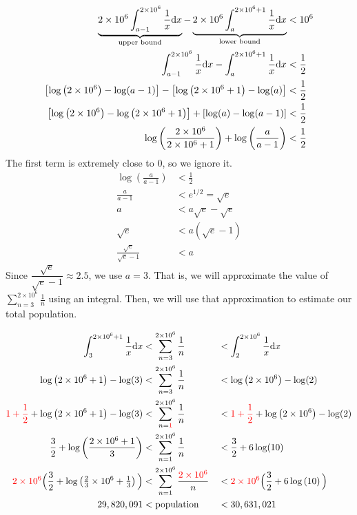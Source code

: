 \begin{solution}
	\begin{align*}
	\underbrace{2\times 10^6\int_{a-1}^{2\times 10^6} \frac{1}{x}\mathrm{d}x}_{\text{upper bound}} -
	\underbrace{2\times 10^6\int_{a}^{2\times 10^6+1} \frac{1}{x}\mathrm{d}x}_{\text{lower bound}} &<10^6\\
\int_{a-1}^{2\times 10^6} \frac{1}{x}\mathrm{d}x -
	\int_{a}^{2\times 10^6+1} \frac{1}{x}\mathrm{d}x &<\frac{1}{2}\\
	\left[\log\left(2\times 10^6 \right)-\log(a-1)\right]-\left[\log\left(2\times 10^6+1 \right)-\log(a)\right]&<\frac12\\
	\left[\log\left(2\times 10^6 \right)-\log\left(2\times 10^6+1 \right)\right]+\left[ \log(a)-\log(a-1)\right]&<\frac12\\
	\log\left(\frac{2\times 10^6}{2\times 10^6+1} \right)+
	\log\left(\frac{a}{a-1} \right)&<\frac{1}{2}
	\end{align*}
	The first term is extremely close to 0, so we ignore it.
	\begin{align*}
	\log\left(\frac{a}{a-1} \right)&<\frac{1}{2}\\
	\frac{a}{a-1}&<e^{1/2}=\sqrt{e}\\
	a&<a\sqrt{e}-\sqrt{e}\\
	\sqrt{e}&<a(\sqrt{e}-1)\\
	\frac{\sqrt{e}}{\sqrt{e}-1}&<a
	\end{align*}
	Since $\dfrac{\sqrt{e}}{\sqrt{e}-1} \approx 2.5$, we use $a=3$. That is, we will approximate the value of $\displaystyle\sum_{n=3}^{2\times 10^6}\frac{1}{n}$ using an integral. Then, we will use that approximation to estimate our total population.

	\begin{alignat*}{5}
\int_3^{2\times 10^6+1}\frac{1}{x}\mathrm{d}x&<\sum_{n=3}^{2\times 10^6}\frac{1}{n} &&<\int_2^{2\times10^6}\frac{1}{x}\mathrm{d}x
\\
\log\left(2\times 10^6+1\right)-\log(3) &<\sum_{n=3}^{2\times 10^6}\frac{1}{n} &&<\log\left(2\times10^6\right)-\log(2)
\\
\textcolor{red}{1+\frac12}+\log\left(2\times 10^6+1\right)-\log(3) &<\sum_{n=\textcolor{red}{1}}^{2\times 10^6}\frac{1}{n} &&<\textcolor{red}{1+\frac12}+\log\left(2\times10^6\right)-\log(2)
\\
\frac32+ \log\left(\frac{2\times 10^6+1}{3}\right) &<\sum_{n=1}^{2\times 10^6}\frac{1}{n} &&<\frac32+6\log(10)
\\
\textcolor{red}{2\times10^6}\Big(\frac32+ \log\left(\tfrac{2}{3}\times 10^6+\tfrac{1}{3}\right)\Big) &<\sum_{n=1}^{2\times 10^6}\frac{\textcolor{red}{2\times10^6}}{n} &&<\textcolor{red}{2\times10^6}\Big(\frac32+6\log\left(10\right)\Big)
\\
29,820,091&<\text{population}&&<30,631,021
	\end{alignat*}


\end{solution}
